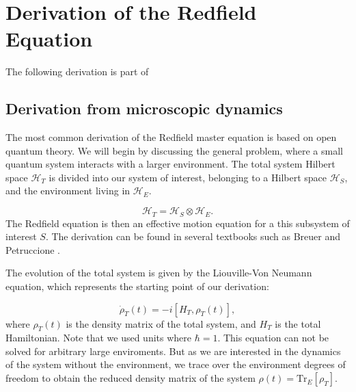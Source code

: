 \chapter{Derivation of the Redfield Equation} %
\label{Chapter:Derivation_Redfield_Equation} %

The following derivation is part of \cite{manzanoShortIntroductionLindblad2020}

\section{Derivation from microscopic dynamics}
\label{sec:Derivation_redfield_eq_from_microscopic_dynamics}
The most common derivation of the Redfield master equation is based on open quantum theory.
We will begin by discussing the general problem, where a small quantum system interacts with a larger environment.
The total system Hilbert space $\mathcal{H}_T$ is divided into our system of interest, belonging to a Hilbert space $\mathcal{H}_S$, and the environment living in $\mathcal{H}_E$.

\begin{equation}
	\mathcal{H}_T = \mathcal{H}_S \otimes \mathcal{H}_E.
	\label{eq:Total_Hilbert_Space}
\end{equation}
The Redfield equation is then an effective motion equation for a this subsystem of interest $ S $.
The derivation can be found in several textbooks such as Breuer and Petruccione \cite{breuerTheoryOpenQuantum2009}.

The evolution of the total system is given by the Liouville-Von Neumann equation, which represents the starting point of our derivation:

\begin{equation}
	\dot{\rho}_T(t) = -i[H_T, \rho_T(t)],
	\label{eq:Von_Neumann_Equation}
\end{equation}
where $\rho_T(t)$ is the density matrix of the total system, and $H_T$ is the total Hamiltonian.
Note that we used units where $\hbar = 1$.
This equation can not be solved for arbitrary large enviroments.
But as we are interested in the dynamics of the system without the environment,
we trace over the environment degrees of freedom to obtain the reduced density matrix of the system
$\rho(t) = \mathrm{Tr}_E[\rho_T]$.

